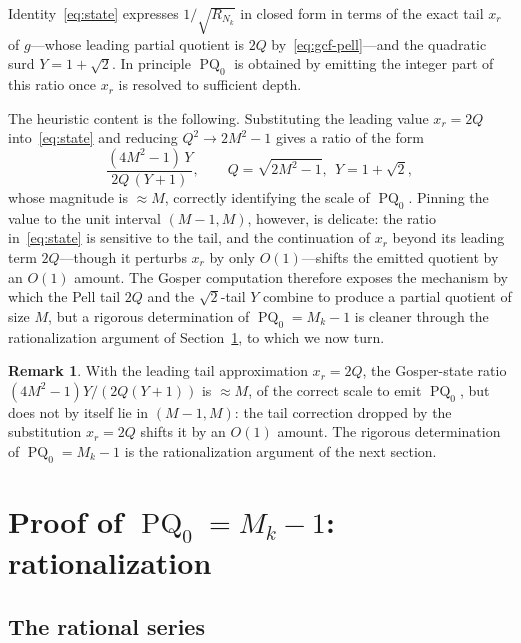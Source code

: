 \documentclass[12pt]{amsart}
\theoremstyle{definition}
\newtheorem{remark}[theorem]{Remark}
\DeclareMathOperator{\PQ}{PQ}
\begin{document}
Identity~\eqref{eq:state} expresses $1/\sqrt{R_{N_k}}$ in closed form
in terms of the exact tail $x_r$ of $g$---whose leading partial quotient
is $2Q$ by~\eqref{eq:gcf-pell}---and the quadratic surd $Y = 1+\sqrt{2}$.
In principle $\PQ_0$ is obtained by emitting the integer part of this
ratio once $x_r$ is resolved to sufficient depth.

The heuristic content is the following.  Substituting the leading value
$x_r = 2Q$ into~\eqref{eq:state} and reducing $Q^2 \to 2M^2-1$ gives a
ratio of the form
\[
  \frac{(4M^2-1)\,Y}{2Q\,(Y+1)},
  \qquad Q = \sqrt{2M^2-1},\ \ Y = 1+\sqrt{2},
\]
whose magnitude is $\approx M$, correctly identifying the scale of
$\PQ_0$.  Pinning the value to the unit interval $(M-1, M)$, however,
is delicate: the ratio in~\eqref{eq:state} is sensitive to the tail, and
the continuation of $x_r$ beyond its leading term $2Q$---though it
perturbs $x_r$ by only $O(1)$---shifts the emitted quotient by an
$O(1)$ amount.  The Gosper computation therefore exposes the mechanism
by which the Pell tail $2Q$ and the $\sqrt{2}$-tail $Y$ combine to
produce a partial quotient of size $M$, but a rigorous determination of
$\PQ_0 = M_k - 1$ is cleaner through the rationalization argument of
Section~\ref{sec:rational}, to which we now turn.

\begin{remark}
  With the leading tail approximation $x_r = 2Q$, the Gosper-state
  ratio $(4M^2-1)Y/(2Q(Y+1))$ is $\approx M$, of the correct scale to
  emit $\PQ_0$, but does not by itself lie in $(M-1, M)$: the tail
  correction dropped by the substitution $x_r = 2Q$ shifts it by an
  $O(1)$ amount.  The rigorous determination of $\PQ_0 = M_k - 1$ is the
  rationalization argument of the next section.
\end{remark}

\section{Proof of $\PQ_0 = M_k-1$: rationalization}
\label{sec:rational}

\subsection{The rational series}
\end{document}
